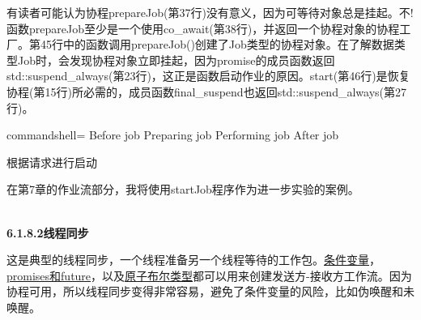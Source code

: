 有读者可能认为协程prepareJob(第37行)没有意义，因为可等待对象总是挂起。不!函数prepareJob至少是一个使用co\_await(第38行)，并返回一个协程对象的协程工厂。第45行中的函数调用prepareJob()创建了Job类型的协程对象。在了解数据类型Job时，会发现协程对象立即挂起，因为promise的成员函数返回std::suspend\_always(第23行)，这正是函数启动作业的原因。start(第46行)是恢复协程(第15行)所必需的，成员函数final\_suspend也返回std::suspend\_always(第27行)。

\begin{tcblisting}{commandshell={}}
Before job
    Preparing job
    Performing job
After job
\end{tcblisting}

\begin{center}
根据请求进行启动
\end{center}

在第7章的作业流部分，我将使用startJob程序作为进一步实验的案例。

\hspace*{\fill} \\ %
\noindent
\textbf{6.1.8.2\hspace{0.2cm}线程同步}

这是典型的线程同步，一个线程准备另一个线程等待的工作包。\href{https://en.cppreference.com/w/cpp/thread/condition_variable}{条件变量}， \href{https://en.cppreference.com/w/cpp/thread}{promises和future}，以及\href{https://en.cppreference.com/w/cpp/atomic/atomic}{原子布尔类型}都可以用来创建发送方-接收方工作流。因为协程可用，所以线程同步变得非常容易，避免了条件变量的风险，比如伪唤醒和未唤醒。

